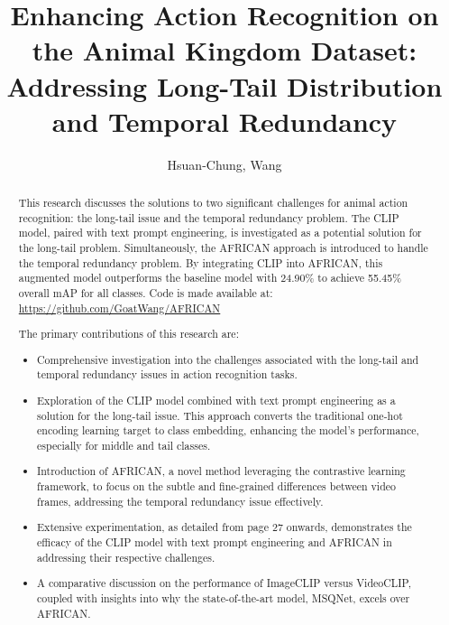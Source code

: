 \documentclass[
]{uob-thesis}
\title{Enhancing Action Recognition on the Animal Kingdom Dataset: Addressing Long-Tail Distribution and Temporal Redundancy}
\author{Hsuan-Chung, Wang}
\date{\printdatewithoutmonth{thesisdate}}
\begin{document}

\maketitle
\cleardoubleoddemptypage

\begin{abstract} %

This research discusses the solutions to two significant challenges for animal action recognition: the long-tail issue and the temporal redundancy problem. The CLIP model, paired with text prompt engineering, is investigated as a potential solution for the long-tail problem. Simultaneously, the AFRICAN approach is introduced to handle the temporal redundancy problem. By integrating CLIP into AFRICAN, this augmented model outperforms the baseline model with 24.90\% to achieve 55.45\% overall mAP for all classes. Code is made available at: \href{https://github.com/GoatWang/AFRICAN}{https://github.com/GoatWang/AFRICAN}

The primary contributions of this research are:

\begin{itemize}
    \item Comprehensive investigation into the challenges associated with the long-tail and temporal redundancy issues in action recognition tasks.
    \item Exploration of the CLIP model combined with text prompt engineering as a solution for the long-tail issue. This approach converts the traditional one-hot encoding learning target to class embedding, enhancing the model's performance, especially for middle and tail classes.
    \item Introduction of AFRICAN, a novel method leveraging the contrastive learning framework, to focus on the subtle and fine-grained differences between video frames, addressing the temporal redundancy issue effectively.
    \item Extensive experimentation, as detailed from page 27 onwards, demonstrates the efficacy of the CLIP model with text prompt engineering and AFRICAN in addressing their respective challenges.
    \item A comparative discussion on the performance of ImageCLIP versus VideoCLIP, coupled with insights into why the state-of-the-art model, MSQNet, excels over AFRICAN.
\end{itemize}
\end{abstract}
\end{document}
